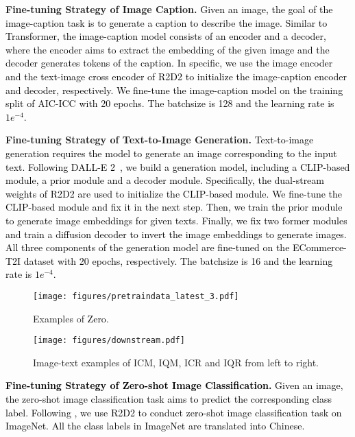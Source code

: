 \documentclass[sigconf]{acmart}
\def\jc{\textcolor{black}}
\def\blue{\textcolor{black}}
\def\mmcr{\textcolor{black}}
\begin{document}
\textbf{Fine-tuning Strategy of Image Caption.}
\jc{Given an image, the goal of the image-caption task is to generate a caption to describe the image. Similar to Transformer\cite{Transformer}, the image-caption model consists of an encoder and a decoder, where the encoder aims to extract the embedding of the given image and the decoder generates tokens of the caption. In specific, we use the image encoder and the text-image cross encoder of \mmcr{R2D2} to initialize the image-caption encoder and decoder, respectively.
We fine-tune the image-caption model on the training split of AIC-ICC \cite{aic} with 20 epochs. The batchsize is 128 and the learning rate is $1e^{-4}$.
}


\textbf{Fine-tuning Strategy of Text-to-Image Generation.}
\jc{Text-to-image generation requires the model to generate an image corresponding to the input text.
Following DALL-E 2~\cite{DALLE2}, we build a generation model, including a CLIP-based module, a prior module and a decoder module. Specifically, the dual-stream weights of \mmcr{R2D2} are used to initialize the CLIP-based module. We fine-tune the CLIP-based module and fix it in the next step. Then, we train the prior module to generate image embeddings for given texts. Finally, we fix two former modules and train a diffusion decoder to invert the image embeddings to generate images. All three components of the generation model are fine-tuned on the ECommerce-T2I dataset with 20 epochs, respectively. The batchsize is 16 and the learning rate is $1e^{-4}$.}


\begin{figure*}[h]
    \renewcommand\thefigure{A}
    \centering
	\texttt{[image: figures/pretraindata\_latest\_3.pdf]}
	\caption{Examples of \mmcr{Zero}.} 
	\label{fig:pretraindata}
\end{figure*}

\begin{figure*}[h]
    \renewcommand\thefigure{B}
    \centering
	\texttt{[image: figures/downstream.pdf]}
    \caption{Image-text examples of ICM, IQM, ICR and IQR from left to right.}
	\label{fig:downstream} 
\end{figure*}

\textbf{\blue{Fine-tuning Strategy of Zero-shot Image Classification.}}
\blue{Given an image, the zero-shot image classification task aims to predict the corresponding class label. Following \cite{gu2022wukong}, we use \mmcr{R2D2} to conduct zero-shot image classification task on ImageNet\cite{imagenet}. All the class labels in ImageNet are translated into Chinese.}
\end{document}
